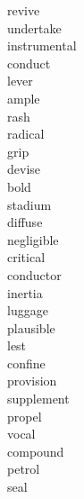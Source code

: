 \documentclass[b5paper, 11pt]{ctexart}
\begin{document}
\begin{multicols*}{3}
\begin{description}
\item[revive]

\item[undertake]

\item[instrumental]

\item[conduct]

\item[lever]

\item[ample]

\item[rash]

\item[radical]

\item[grip]

\item[devise]

\item[bold]

\item[stadium]

\item[diffuse]

\item[negligible]

\item[critical]

\item[conductor]

\item[inertia]

\item[luggage]

\item[plausible]

\item[lest]

\item[confine]

\item[provision]

\item[supplement]

\item[propel]

\item[vocal]

\item[compound]

\item[petrol]

\item[seal]


\end{description}
\end{multicols*}
\end{document}
